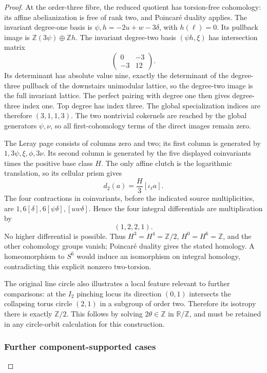 \begin{proof}
At the order-three fibre, the reduced quotient has torsion-free cohomology: its affine abelianization is free of rank two, and Poincaré duality applies. The invariant degree-one basis is \(\psi,h=-2u+w-3\delta\), with \(h(\ell)=0\). Its pullback image is \(\mathbb Z(3\psi)\oplus\mathbb Zh\). The invariant degree-two basis \((\psi h,\xi)\) has intersection matrix \[
 \begin{pmatrix}0&-3\\-3&12\end{pmatrix}.
\] Its determinant has absolute value nine, exactly the determinant of the degree-three pullback of the downstairs unimodular lattice, so the degree-two image is the full invariant lattice. The perfect pairing with degree one then gives degree-three index one. Top degree has index three. The global specialization indices are therefore \((3,1,1,3)\). The two nontrivial cokernels are reached by the global generators \(\psi,\nu\), so all first-cohomology terms of the direct images remain zero.

The Leray page consists of columns zero and two; its first column is generated by \(1,3\psi,\xi,\phi,3\nu\). Its second column is generated by the five displayed coinvariants times the positive base class \(H\). The only affine clutch is the logarithmic translation, so its cellular prism gives \[
 d_2(a)=\frac H3[\iota_\ell a].
\] The four contractions in coinvariants, before the indicated source multiplicities, are \(1,6[\delta],6[\psi\delta],[uw\delta]\). Hence the four integral differentials are multiplication by \[
 (1,2,2,1).
\] No higher differential is possible. Thus \(H^3=H^4=\mathbb Z/2\), \(H^0=H^6=\mathbb Z\), and the other cohomology groups vanish; Poincaré duality gives the stated homology. A homeomorphism to \(S^6\) would induce an isomorphism on integral homology, contradicting this explicit nonzero two-torsion.

The original line circle also illustrates a local feature relevant to further comparisons: at the \(I_2\) pinching locus its direction \((0,1)\) intersects the collapsing torus circle \((2,1)\) in a subgroup of order two. Therefore its isotropy there is exactly \(\mathbb Z/2\). This follows by solving \(2\theta\in\mathbb Z\) in \(\mathbb R/\mathbb Z\), and must be retained in any circle-orbit calculation for this construction.

\subsubsection{Further component-supported cases}\label{further-component-supported-cases}


\end{proof}
